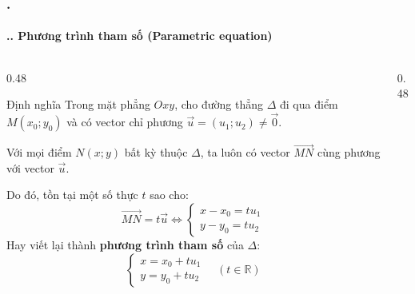 \documentclass[11pt, aspectratio=169]{beamer}
\begin{document}
\begin{frame}[fragile]
    \frametitle{\thesection. \insertsection}
    \framesubtitle{\thesection.\thesubsection. Phương trình tham số (Parametric equation)}
    \vspace{-0.5cm}
    \begin{columns}[T, onlytextwidth]
        \begin{column}{0.48\textwidth}
            \begin{block}{Định nghĩa}
                \footnotesize
                Trong mặt phẳng $Oxy$, cho đường thẳng $\Delta$ đi qua điểm $M(x_0; y_0)$ và có vector chỉ phương $\vec{u} = (u_1; u_2) \neq \vec{0}$.
                
                Với mọi điểm $N(x; y)$ bất kỳ thuộc $\Delta$, ta luôn có vector $\overrightarrow{MN}$ cùng phương với vector $\vec{u}$.
                
                Do đó, tồn tại một số thực $t$ sao cho:
                \[
                    \overrightarrow{MN} = t\vec{u} \Leftrightarrow
                    \begin{cases}
                        x - x_0 = tu_1 \\
                        y - y_0 = tu_2
                    \end{cases}
                \]
                Hay viết lại thành \textbf{phương trình tham số} của $\Delta$:
                \[
                    \boxed{
                    \begin{cases}
                        x = x_0 + tu_1 \\
                        y = y_0 + tu_2
                    \end{cases}
                    } \quad (t \in \mathbb{R})
                \]
            \end{block}
        \end{column}
        
        \begin{column}{0.48\textwidth}
            \centering
            \vspace{0.2cm} %
\end{column}
\end{columns}
\end{frame}
\end{document}
